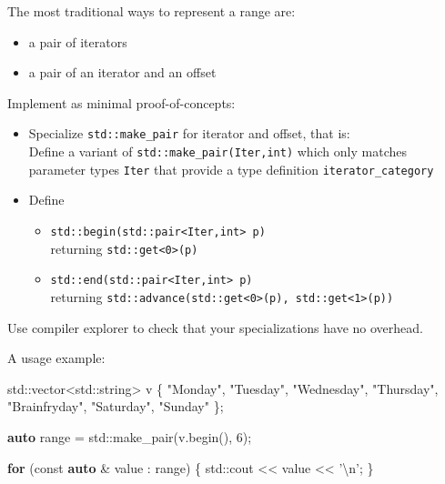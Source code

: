 \documentclass[]{article}
\newenvironment{Shaded}{}{}
\newcommand{\KeywordTok}[1]{\textcolor[rgb]{0.00,0.44,0.13}{\textbf{{#1}}}}
\newcommand{\DataTypeTok}[1]{\textcolor[rgb]{0.56,0.13,0.00}{{#1}}}
\newcommand{\DecValTok}[1]{\textcolor[rgb]{0.25,0.63,0.44}{{#1}}}
\newcommand{\CharTok}[1]{\textcolor[rgb]{0.25,0.44,0.63}{{#1}}}
\newcommand{\StringTok}[1]{\textcolor[rgb]{0.25,0.44,0.63}{{#1}}}
\newcommand{\NormalTok}[1]{{#1}}
\providecommand{\tightlist}{%
  \setlength{\itemsep}{0pt}\setlength{\parskip}{0pt}}
\begin{document}
The most traditional ways to represent a range are:

\begin{itemize}
\tightlist
\item
  a pair of iterators
\item
  a pair of an iterator and an offset
\end{itemize}

Implement as minimal proof-of-concepts:

\begin{itemize}
\tightlist
\item
  Specialize \texttt{std::make\_pair} for iterator and offset, that
  is:\\
   Define a variant of \texttt{std::make\_pair(Iter,int)} which only
  matches parameter types \texttt{Iter} that provide a type definition
  \texttt{iterator\_category}
\item
  Define

  \begin{itemize}
  \tightlist
  \item
    \texttt{std::begin(std::pair\textless{}Iter,int\textgreater{}\ p)}\\
     returning \texttt{std::get\textless{}0\textgreater{}(p)}
  \item
    \texttt{std::end(std::pair\textless{}Iter,int\textgreater{}\ p)}\\
     returning
    \texttt{std::advance(std::get\textless{}0\textgreater{}(p),\ std::get\textless{}1\textgreater{}(p))}
  \end{itemize}
\end{itemize}

Use compiler explorer to check that your specializations have no
overhead.

A usage example:

\begin{Shaded}
\begin{Highlighting}[]
\NormalTok{std::vector<std::string> v \{}
   \StringTok{"Monday"}\NormalTok{, }\StringTok{"Tuesday"}\NormalTok{, }\StringTok{"Wednesday"}\NormalTok{,}
   \StringTok{"Thursday"}\NormalTok{, }\StringTok{"Brainfryday"}\NormalTok{, }\StringTok{"Saturday"}\NormalTok{, }\StringTok{"Sunday"} \NormalTok{\};}

\KeywordTok{auto} \NormalTok{range = std::make_pair(v.begin(), }\DecValTok{6}\NormalTok{);}

\KeywordTok{for} \NormalTok{(}\DataTypeTok{const} \KeywordTok{auto} \NormalTok{& value : range) \{}
   \NormalTok{std::cout << value << }\StringTok{'}\CharTok{\textbackslash{}n}\StringTok{'}\NormalTok{;}
\NormalTok{\}}
\end{Highlighting}
\end{Shaded}
\end{document}
